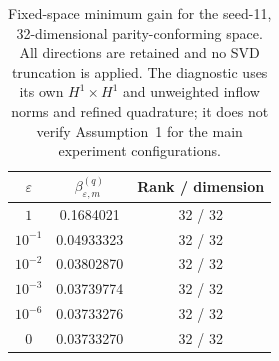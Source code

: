 \begin{table}[!htb]
\centering\small
\setlength{\tabcolsep}{12pt}
\caption{Fixed-space minimum gain for the seed-11, 32-dimensional parity-conforming space. All directions are retained and no SVD truncation is applied. The diagnostic uses its own $H^1\times H^1$ and unweighted inflow norms and refined quadrature; it does not verify Assumption~1 for the main experiment configurations.}
\label{tab:minimum-gain}
\begin{tabular}{ccc}
\toprule
$\varepsilon$ & $\beta_{\varepsilon,m}^{(q)}$ & Rank / dimension\\
\midrule
$1$ & 0.1684021 & 32 / 32\\
$10^{-1}$ & 0.04933323 & 32 / 32\\
$10^{-2}$ & 0.03802870 & 32 / 32\\
$10^{-3}$ & 0.03739774 & 32 / 32\\
$10^{-6}$ & 0.03733276 & 32 / 32\\
$0$ & 0.03733270 & 32 / 32\\
\bottomrule
\end{tabular}
\end{table}

\begin{table}[!htb]
\centering\small
\setlength{\tabcolsep}{3.5pt}
\caption{Random-feature refinement at fixed residual dimension and $\varepsilon=10^{-3}$. Values are medians over seeds 11, 23 and 37 from the same runs as the accuracy-cost tables.}
\label{tab:feature-resolution}
\end{table}

